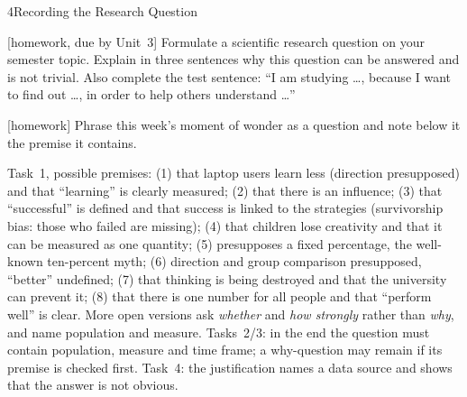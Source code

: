 \begin{uebungsblattb}{4}{Recording the Research Question}

[homework, due by Unit~3]
Formulate a scientific research question on your semester topic. Explain
in three sentences why this question can be answered and is not trivial.
Also complete the test sentence: \enquote{I am studying \dots, because I
want to find out \dots, in order to help others understand \dots}

[homework]
Phrase this week's moment of wonder as a question and note below it the
premise it contains.

\begin{lehrhinweis}
Task~1, possible premises: (1) that laptop users learn less (direction
presupposed) and that \enquote{learning} is clearly measured; (2) that
there is an influence; (3) that \enquote{successful} is defined and that
success is linked to the strategies (survivorship bias: those who failed
are missing); (4) that children lose creativity and that it can be
measured as one quantity; (5) presupposes a fixed percentage, the
well-known ten-percent myth; (6) direction and group comparison
presupposed, \enquote{better} undefined; (7) that thinking is being
destroyed and that the university can prevent it; (8) that there is one
number for all people and that \enquote{perform well} is clear. More open
versions ask \emph{whether} and \emph{how strongly} rather than
\emph{why}, and name population and measure. Tasks~2/3: in the end the
question must contain population, measure and time frame; a why-question
may remain if its premise is checked first. Task~4: the justification
names a data source and shows that the answer is not obvious.
\end{lehrhinweis}
\end{uebungsblattb}
